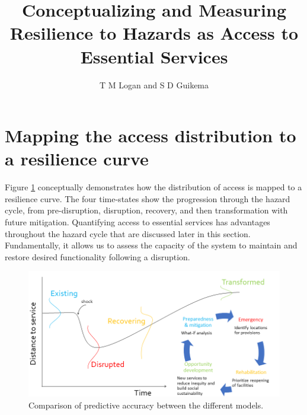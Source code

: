 \documentclass[9pt,twoside,lineno]{pnas-new}
\title{Conceptualizing and Measuring Resilience to Hazards as Access to Essential Services}
\author{T M Logan and S D Guikema}
\begin{document}

\maketitle

\SItext

\section*{Mapping the access distribution to a resilience curve}

Figure \ref{fig:cdf_to_res} conceptually demonstrates how the distribution of access is mapped to a resilience curve. The four time-states show the progression through the hazard cycle, from pre-disruption, disruption, recovery, and then transformation with future mitigation. Quantifying access to essential services has advantages throughout the hazard cycle that are discussed later in this section. Fundamentally, it allows us to assess the capacity of the system to maintain and restore desired functionality following a disruption. 


\begin{figure}
    \centering
    \includegraphics[width=\linewidth]{report/fig/Figure_2.png}
    \caption{
    Comparison of predictive accuracy between the different models.
    }
    \label{fig:cdf_to_res}
\end{figure}



\end{document}
